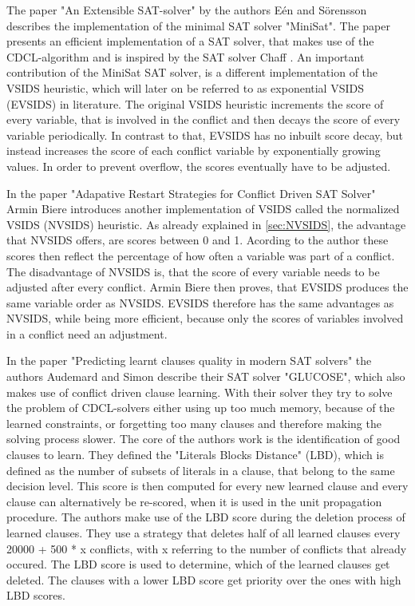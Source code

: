 The paper "An Extensible SAT-solver" \cite{een2003extensible} by the authors E{\'e}n and Sörensson describes the implementation of the minimal SAT solver "MiniSat". The paper presents an efficient implementation of a SAT solver, that makes use of the CDCL-algorithm and is inspired by the SAT solver Chaff \cite{moskewicz2001chaff}. An important contribution of the MiniSat SAT solver, is a different implementation of the VSIDS heuristic, which will later on be referred to as exponential VSIDS (EVSIDS) in literature. The original VSIDS heuristic increments the score of every variable, that is involved in the conflict and then decays the score of every variable periodically. In contrast to that, EVSIDS has no inbuilt score decay, but instead increases the score of each conflict variable by exponentially growing values. In order to prevent overflow, the scores eventually have to be adjusted.

In the paper "Adapative Restart Strategies for Conflict Driven SAT Solver" \cite{biere2008adaptive} Armin Biere introduces another implementation of VSIDS called the normalized VSIDS (NVSIDS) heuristic. As already explained in \ref{sec:NVSIDS}, the advantage that NVSIDS offers, are scores between 0 and 1. Acording to the author these scores then reflect the percentage of how often a variable was part of a conflict. The disadvantage of NVSIDS is, that the score of every variable needs to be adjusted after every conflict. Armin Biere then proves, that EVSIDS produces the same variable order as NVSIDS. EVSIDS therefore has the same advantages as NVSIDS, while being more efficient, because only the scores of variables involved in a conflict need an adjustment.

In the paper "Predicting learnt clauses quality in modern SAT solvers" \cite{audemard2009predicting} the authors Audemard and Simon describe their SAT solver "GLUCOSE", which also makes use of conflict driven clause learning. With their solver they try to solve the problem of CDCL-solvers either using up too much memory, because of the learned constraints, or forgetting too many clauses and therefore making the solving process slower. The core of the authors work is the identification of good clauses to learn. They defined the "Literals Blocks Distance" (LBD), which is defined as the number of subsets of literals in a clause, that belong to the same decision level. This score is then computed for every new learned clause and every clause can alternatively be re-scored, when it is used in the unit propagation procedure. The authors make use of the LBD score during the deletion process of learned clauses. They use a strategy that deletes half of all learned clauses every 20000 + 500 * x conflicts, with x referring to the number of conflicts that already occured. The LBD score is used to determine, which of the learned clauses get deleted. The clauses with a lower LBD score get priority over the ones with high LBD scores.

